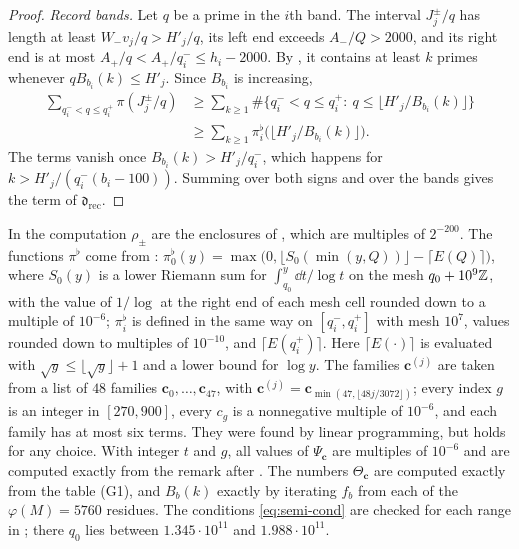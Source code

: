 \documentclass[11pt,colorlinks]{charlie}
\begin{document}
\begin{proof}
\emph{Record bands.} Let $q$ be a prime in the $i$th band. The interval $J_j^\pm/q$ has length at least $W_-v_j/q>H'_j/q$, its left end exceeds $A_-/Q>2000$, and its right end is at most $A_+/q<A_+/q_i^-\le h_i-2000$. By , it contains at least $k$ primes whenever $qB_{b_i}(k)\le H'_j$. Since $B_{b_i}$ is increasing,
\begin{align*}
 \sum_{q_i^-<q\le q_i^+}\pi(J_j^\pm/q)&\ge\sum_{k\ge1}\#\big\{q_i^-<q\le q_i^+:\ q\le\lfloor H'_j/B_{b_i}(k)\rfloor\big\}\\
 &\ge\sum_{k\ge1}\pi_i^\flat\big(\lfloor H'_j/B_{b_i}(k)\rfloor\big).
\end{align*}
The terms vanish once $B_{b_i}(k)>H'_j/q_i^-$, which happens for $k>H'_j/(q_i^-(b_i-100))$. Summing over both signs and over the bands gives the term of $\mathfrak d_{\mathrm{rec}}$.
\end{proof}

\begin{remark}[Evaluation]\label{rem:semi-eval}
In the computation $\rho_\pm$ are the enclosures of , which are multiples of $2^{-200}$. The functions $\pi^\flat$ come from : $\pi_0^\flat(y)=\max\big(0,\lfloor S_0(\min(y,Q))\rfloor-\lceil E(Q)\rceil\big)$, where $S_0(y)$ is a lower Riemann sum for $\int_{q_0}^y\dd t/\log t$ on the mesh $q_0+10^9\mathbb{Z}$, with the value of $1/\log$ at the right end of each mesh cell rounded down to a multiple of $10^{-6}$; $\pi_i^\flat$ is defined in the same way on $[q_i^-,q_i^+]$ with mesh $10^7$, values rounded down to multiples of $10^{-10}$, and $\lceil E(q_i^+)\rceil$. Here $\lceil E(\cdot)\rceil$ is evaluated with $\sqrt y\le\lfloor\sqrt y\rfloor+1$ and a lower bound for $\log y$. The families $\mathbf c^{(j)}$ are taken from a list of $48$ families $\mathbf c_0,\dots,\mathbf c_{47}$, with $\mathbf c^{(j)}=\mathbf c_{\min(47,\lfloor48j/3072\rfloor)}$; every index $g$ is an integer in $[270,900]$, every $c_g$ is a nonnegative multiple of $10^{-6}$, and each family has at most six terms. They were found by linear programming, but  holds for any choice. With integer $t$ and $g$, all values of $\Psi_{\mathbf c}$ are multiples of $10^{-6}$ and are computed exactly from the remark after . The numbers $\Theta_{\mathbf c}$ are computed exactly from the table (G1), and $B_b(k)$ exactly by iterating $f_b$ from each of the $\varphi(M)=5760$ residues. The conditions \eqref{eq:semi-cond} are checked for each range in ; there $q_0$ lies between $1.345\cdot10^{11}$ and $1.988\cdot10^{11}$.
\end{remark}
\end{document}
